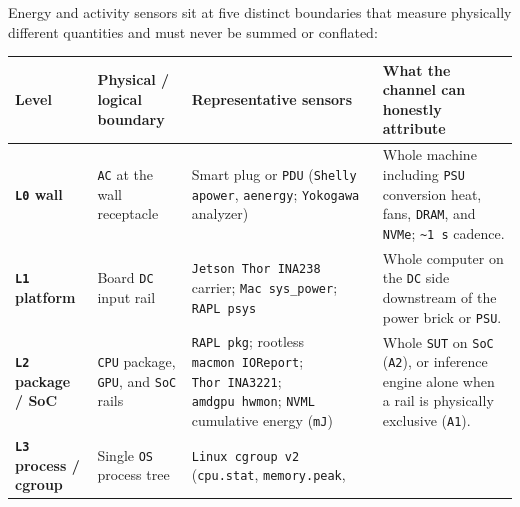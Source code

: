 \documentclass[10pt,letterpaper]{article}
\begin{document}
Energy and activity sensors sit at five distinct boundaries that measure
physically different quantities and must never be summed or conflated:

{\footnotesize\setlength{\tabcolsep}{3.8pt}\renewcommand{\arraystretch}{1.15}
\begin{longtable}[]{@{}
  >{\raggedright\arraybackslash}p{}
  >{\raggedright\arraybackslash}p{}
  >{\raggedright\arraybackslash}p{}
  >{\raggedright\arraybackslash}p{}@{}}
\toprule\noalign{}
\begin{minipage}[b]{\linewidth}\raggedright
\textbf{Level}
\end{minipage} & \begin{minipage}[b]{\linewidth}\raggedright
\textbf{Physical / logical boundary}
\end{minipage} & \begin{minipage}[b]{\linewidth}\raggedright
\textbf{Representative sensors}
\end{minipage} & \begin{minipage}[b]{\linewidth}\raggedright
\textbf{What the channel can honestly attribute}
\end{minipage} \\
\midrule\noalign{}
\endhead
\bottomrule\noalign{}
\endlastfoot
\textbf{\texttt{L0} wall} & \texttt{AC} at the wall receptacle & Smart
plug or \texttt{PDU} (\texttt{Shelly} \texttt{apower}, \texttt{aenergy};
\texttt{Yokogawa} analyzer) & Whole machine including \texttt{PSU}
conversion heat, fans, \texttt{DRAM}, and \texttt{NVMe};
\texttt{\textasciitilde{}1\ s} cadence. \\
\textbf{\texttt{L1} platform} & Board \texttt{DC} input rail &
\texttt{Jetson\ Thor\ INA238} carrier; \texttt{Mac\ sys\_\allowbreak{}power};
\texttt{RAPL\ psys} & Whole computer on the \texttt{DC} side downstream
of the power brick or \texttt{PSU}. \\
\textbf{\texttt{L2} package / SoC} & \texttt{CPU} package, \texttt{GPU},
and \texttt{SoC} rails & \texttt{RAPL\ pkg}; rootless
\texttt{macmon\ IOReport}; \texttt{Thor\ INA3221};
\texttt{amdgpu\ hwmon}; \texttt{NVML} cumulative energy (\texttt{mJ}) &
Whole \texttt{SUT} on \texttt{SoC} (\texttt{A2}), or inference engine
alone when a rail is physically exclusive (\texttt{A1}). \\
\textbf{\texttt{L3} process / cgroup} & Single \texttt{OS} process tree
& \texttt{Linux\ cgroup\ v2} (\texttt{cpu.stat}, \texttt{memory.\allowbreak{}peak},

\end{longtable}}
\end{document}
